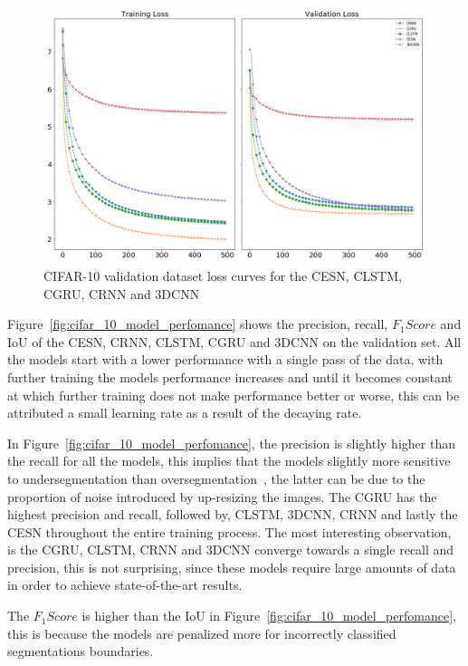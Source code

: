 \documentclass{WitsPhysicsReport}
\begin{document}
\begin{figure}[H]
\centering
  \includegraphics[width=1\textwidth]{Figure/Results/CIFAR_10_loss.png}
\caption{CIFAR-10 validation dataset loss curves for the CESN, CLSTM, CGRU, CRNN and 3DCNN}
 \label{fig:cifar_10_model_loss}
\end{figure}

Figure~\ref{fig:cifar_10_model_perfomance} shows the precision, recall, $F_{1}Score$ and IoU of the CESN, CRNN, CLSTM, CGRU and 3DCNN on the validation set. All the models start with a lower performance with a single pass of the data, with further training the models performance increases and until it becomes constant at which further training does not make performance better or worse, this can be attributed a small learning rate as a result of the decaying rate.

In Figure~\ref{fig:cifar_10_model_perfomance}, the precision is slightly higher than the recall for all the models, this implies that the models slightly more sensitive to undersegmentation than oversegmentation~\cite{sigut2015over, troya2015unsupervised}, the latter can be due to the proportion of noise introduced by up-resizing the images. The CGRU has the highest precision and recall, followed by, CLSTM, 3DCNN, CRNN and lastly the CESN throughout the entire training process. The most interesting observation, is the CGRU, CLSTM, CRNN and 3DCNN converge towards a single recall and precision, this is not surprising, since these models require large amounts of data in order to achieve state-of-the-art results.

The $F_{1}Score$ is higher than the IoU in Figure~\ref{fig:cifar_10_model_perfomance}, this is because the models are penalized more for incorrectly classified segmentations boundaries. %
\end{document}
